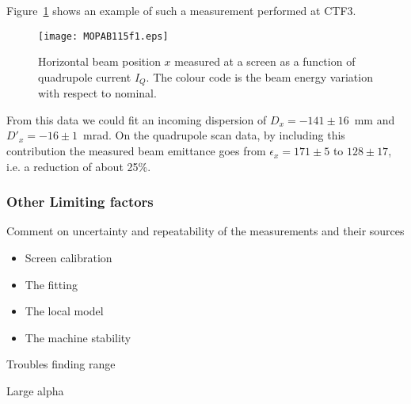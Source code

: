 Figure~\ref{fig:dispersionFit} shows an example of such a measurement
performed at CTF3.
%
\begin{figure}[htb]
   \centering
   \texttt{[image: MOPAB115f1.eps]}
   \caption{Horizontal beam position $x$ measured at a screen as a function of quadrupole current $I_Q$. The colour code is the beam energy variation with respect to nominal.}
   \label{fig:dispersionFit}
\end{figure}
%
From this data we could fit an incoming dispersion of  $D_x = -141 \pm 16$~mm
and $D'_x = -16 \pm 1$~mrad.
On the quadrupole scan data, by including this contribution the measured beam
emittance goes from $\epsilon_x = 171\pm5$ to $128\pm17$, i.e. a reduction of
about 25\%.



\subsubsection{Other Limiting factors}


Comment on uncertainty and repeatability of the measurements and their sources
\begin{itemize}
\item Screen calibration
\item The fitting
\item The local model
\item The machine stability
\end{itemize}


Troubles finding range

Large alpha 


